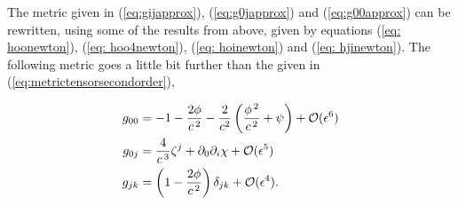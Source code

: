 The metric given in (\ref{eq:gijapprox}), (\ref{eq:g0japprox}) and (\ref{eq:g00approx}) can be rewritten, using some of the results from above, given by equations (\ref{eq: hoonewton}), (\ref{eq: hoo4newton}), (\ref{eq: hoinewton}) and (\ref {eq: hjinewton}). The following metric goes a little bit further than the given in (\ref{eq:metrictensorsecondorder}),

\begin{subequations}
 \label{eq:finalmetricpn}
\begin{align}
 			g_{00} &= -1-\frac{2\phi}{c^{\hspace{0.05cm}2}} -\frac{2}{c^2}\left(\frac{\phi^{\,2}}{c^{\,2}}+\psi \right) + \mathcal{O}(\epsilon^6) \\
 			g_{0j} &= \frac{4}{c^{\hspace{0.05cm}3}}\zeta^j + \partial_0 \partial_i \chi + \mathcal{O}(\epsilon^5) \\
  			g_{jk} &= \left(1-\frac{2\phi}{c^{\hspace{0.05cm}2}} \right) \delta _{jk} + \mathcal{O}(\epsilon^4). 
	\end{align}
\end{subequations}

